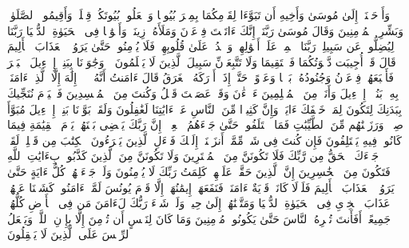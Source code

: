 \startbuffer[\q:10:87]
وَأَوۡحَیۡنَاۤ إِلَىٰ مُوسَىٰ وَأَخِیهِ أَن تَبَوَّءَا لِقَوۡمِكُمَا بِمِصۡرَ بُیُوتࣰا وَٱجۡعَلُوا۟ بُیُوتَكُمۡ قِبۡلَةࣰ وَأَقِیمُوا۟ ٱلصَّلَوٰةَۗ وَبَشِّرِ ٱلۡمُؤۡمِنِینَ%
\stopbuffer%
\startbuffer[\q:10:88]
وَقَالَ مُوسَىٰ رَبَّنَاۤ إِنَّكَ ءَاتَیۡتَ فِرۡعَوۡنَ وَمَلَأَهُۥ زِینَةࣰ وَأَمۡوَٰلࣰا فِی ٱلۡحَیَوٰةِ ٱلدُّنۡیَا رَبَّنَا لِیُضِلُّوا۟ عَن سَبِیلِكَۖ رَبَّنَا ٱطۡمِسۡ عَلَىٰۤ أَمۡوَٰلِهِمۡ وَٱشۡدُدۡ عَلَىٰ قُلُوبِهِمۡ فَلَا یُؤۡمِنُوا۟ حَتَّىٰ یَرَوُا۟ ٱلۡعَذَابَ ٱلۡأَلِیمَ%
\stopbuffer%
\startbuffer[\q:10:89]
قَالَ قَدۡ أُجِیبَت دَّعۡوَتُكُمَا فَٱسۡتَقِیمَا وَلَا تَتَّبِعَاۤنِّ سَبِیلَ ٱلَّذِینَ لَا یَعۡلَمُونَ%
\stopbuffer%
\startbuffer[\q:10:90]
۞ وَجَٰوَزۡنَا بِبَنِیۤ إِسۡرَٰۤءِیلَ ٱلۡبَحۡرَ فَأَتۡبَعَهُمۡ فِرۡعَوۡنُ وَجُنُودُهُۥ بَغۡیࣰا وَعَدۡوًاۖ حَتَّىٰۤ إِذَاۤ أَدۡرَكَهُ ٱلۡغَرَقُ قَالَ ءَامَنتُ أَنَّهُۥ لَاۤ إِلَٰهَ إِلَّا ٱلَّذِیۤ ءَامَنَتۡ بِهِۦ بَنُوۤا۟ إِسۡرَٰۤءِیلَ وَأَنَا۠ مِنَ ٱلۡمُسۡلِمِینَ%
\stopbuffer%
\startbuffer[\q:10:91]
ءَاۤلۡءَٰنَ وَقَدۡ عَصَیۡتَ قَبۡلُ وَكُنتَ مِنَ ٱلۡمُفۡسِدِینَ%
\stopbuffer%
\startbuffer[\q:10:92]
فَٱلۡیَوۡمَ نُنَجِّیكَ بِبَدَنِكَ لِتَكُونَ لِمَنۡ خَلۡفَكَ ءَایَةࣰۚ وَإِنَّ كَثِیرࣰا مِّنَ ٱلنَّاسِ عَنۡ ءَایَٰتِنَا لَغَٰفِلُونَ%
\stopbuffer%
\startbuffer[\q:10:93]
وَلَقَدۡ بَوَّأۡنَا بَنِیۤ إِسۡرَٰۤءِیلَ مُبَوَّأَ صِدۡقࣲ وَرَزَقۡنَٰهُم مِّنَ ٱلطَّیِّبَٰتِ فَمَا ٱخۡتَلَفُوا۟ حَتَّىٰ جَاۤءَهُمُ ٱلۡعِلۡمُۚ إِنَّ رَبَّكَ یَقۡضِی بَیۡنَهُمۡ یَوۡمَ ٱلۡقِیَٰمَةِ فِیمَا كَانُوا۟ فِیهِ یَخۡتَلِفُونَ%
\stopbuffer%
\startbuffer[\q:10:94]
فَإِن كُنتَ فِی شَكࣲّ مِّمَّاۤ أَنزَلۡنَاۤ إِلَیۡكَ فَسۡءَلِ ٱلَّذِینَ یَقۡرَءُونَ ٱلۡكِتَٰبَ مِن قَبۡلِكَۚ لَقَدۡ جَاۤءَكَ ٱلۡحَقُّ مِن رَّبِّكَ فَلَا تَكُونَنَّ مِنَ ٱلۡمُمۡتَرِینَ%
\stopbuffer%
\startbuffer[\q:10:95]
وَلَا تَكُونَنَّ مِنَ ٱلَّذِینَ كَذَّبُوا۟ بِءَایَٰتِ ٱللَّهِ فَتَكُونَ مِنَ ٱلۡخَٰسِرِینَ%
\stopbuffer%
\startbuffer[\q:10:96]
إِنَّ ٱلَّذِینَ حَقَّتۡ عَلَیۡهِمۡ كَلِمَتُ رَبِّكَ لَا یُؤۡمِنُونَ%
\stopbuffer%
\startbuffer[\q:10:97]
وَلَوۡ جَاۤءَتۡهُمۡ كُلُّ ءَایَةٍ حَتَّىٰ یَرَوُا۟ ٱلۡعَذَابَ ٱلۡأَلِیمَ%
\stopbuffer%
\startbuffer[\q:10:98]
فَلَوۡلَا كَانَتۡ قَرۡیَةٌ ءَامَنَتۡ فَنَفَعَهَاۤ إِیمَٰنُهَاۤ إِلَّا قَوۡمَ یُونُسَ لَمَّاۤ ءَامَنُوا۟ كَشَفۡنَا عَنۡهُمۡ عَذَابَ ٱلۡخِزۡیِ فِی ٱلۡحَیَوٰةِ ٱلدُّنۡیَا وَمَتَّعۡنَٰهُمۡ إِلَىٰ حِینࣲ%
\stopbuffer%
\startbuffer[\q:10:99]
وَلَوۡ شَاۤءَ رَبُّكَ لَءَامَنَ مَن فِی ٱلۡأَرۡضِ كُلُّهُمۡ جَمِیعًاۚ أَفَأَنتَ تُكۡرِهُ ٱلنَّاسَ حَتَّىٰ یَكُونُوا۟ مُؤۡمِنِینَ%
\stopbuffer%
\startbuffer[\q:10:100]
وَمَا كَانَ لِنَفۡسٍ أَن تُؤۡمِنَ إِلَّا بِإِذۡنِ ٱللَّهِۚ وَیَجۡعَلُ ٱلرِّجۡسَ عَلَى ٱلَّذِینَ لَا یَعۡقِلُونَ%
